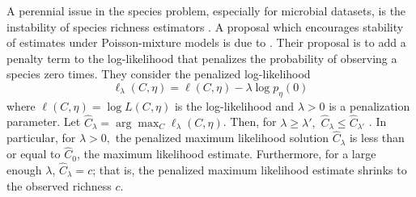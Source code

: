 \documentclass[12pt]{article}
\begin{document}
A perennial issue in the species problem, especially for microbial datasets, is the instability of species richness estimators \citep{Rocchetti:2011tv,willis_2015}.
%
A proposal which encourages stability of estimates under Poisson-mixture models is due to \citet{wang_2005}.  Their proposal is to add a penalty term to the log-likelihood that penalizes the probability of observing a species zero times. They consider the
penalized log-likelihood
\begin{equation}
\ell_\lambda(C, \eta) = \ell(C,\eta) - \lambda \log p_{\eta}(0)
\label{eq:wang_lindsay}
\end{equation}
where $\ell(C,\eta) = \log L(C, \eta)$ is the log-likelihood and $\lambda > 0$ is a penalization parameter.
Let $\hat{C}_\lambda = \arg \max_{C} \ell_\lambda(C, \eta)$.
Then, for $\lambda \geq \lambda',$ $\hat{C}_\lambda \leq \hat{C}_{\lambda'}$ \citep[Theorem 1]{wang_2005}. In particular, for $\lambda > 0,$ the penalized maximum likelihood solution $\hat{C}_\lambda$ is less than or equal to $\hat{C}_0$, the maximum likelihood estimate. Furthermore, for a large enough $\lambda$, $\hat{C}_\lambda = c$; that is, the penalized maximum likelihood estimate shrinks to the observed richness $c$.
\end{document}
